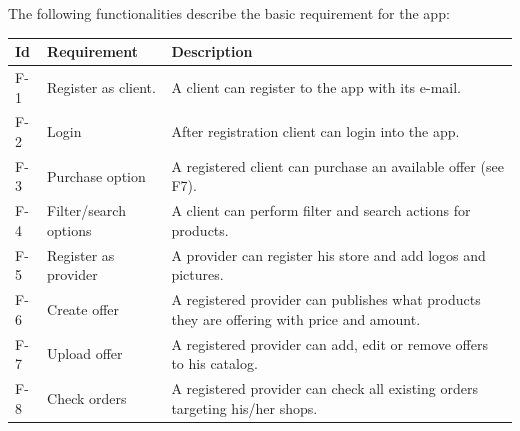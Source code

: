 The following functionalities describe the basic requirement for the \gls{app}:

    \begin{tabularx}{\textwidth}{llX}

    \toprule
    Id & Requirement & Description  \\
    \midrule
    F-1 & Register as \gls{client}. & A \gls{client} can register to the app with its e-mail.\\
    F-2 & Login & After registration \gls{client} can login into the app. \\
    F-3 & Purchase option & A registered \gls{client} can purchase an available offer (see F7).\\
    F-4 & Filter/search options & A \gls{client} can perform filter and search actions for products.\\
    F-5 & Register as \gls{provider} & A \gls{provider} can register his store and add logos and pictures.\\
    F-6 & Create offer & A registered \gls{provider} can publishes what products they are offering with price 
    and amount. \\
    F-7 & Upload offer & A registered \gls{provider} can add, edit or remove offers to his catalog.\\
    F-8 & Check orders & A registered \gls{provider} can check all existing orders targeting his/her shops.\\
    \bottomrule
    \end{tabularx}

